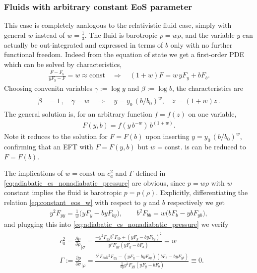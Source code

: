 \subsubsection{Fluids with arbitrary constant EoS parameter}

This case is completely analogous to the relativistic fluid case, simply with general $w$ instead of $w=\tfrac13$.
The fluid is barotropic $p=w\rho$, and the variable $y$ can actually be out-integrated and expressed in terms of $b$ only with no further functional freedom.
Indeed from the equation of state we get a first-order PDE which can be solved by characteristics,
\begin{align}\label{eq:constant_eos_w}
    \frac{F-F_b}{yF_y-F}=w\approx \mathrm{const}\quad\Rightarrow\quad (1+w)F=w\, yF_y+bF_b.
\end{align}
Choosing convenitn variables $\gamma:=\log y$ and $\beta:=\log b$, the characteristics are
{\small
\begin{align}\begin{aligned}
    \dot{\beta}&=1\,,\quad
    \dot{\gamma}=w \quad \Rightarrow\quad y = y_0\, (b/b_0)^w, \quad
    \dot{z}=(1+w)z\,.
\end{aligned}\end{align}}
The general solution is, for an arbitrary function $f=f(z)$ on one variable,
\begin{align}\label{eq:constant_eos_w_solution_pde}
    F(y,b)=f(y\,b^{-w})\, b^{(1+w)}.
\end{align}
Note it reduces to the solution for $F=F(b)$ upon inserting $y = y_0\, (b/b_0)^w$, confirming that 
an EFT with $F=F(y,b)$ but $w=\text{const}.$ is can be reduced to $F=F(b)$.

The implications of $w=\mathrm{const}$ on $c_a^2$ and $\Gamma$ defined in \eqref{eq:adiabatic_cs_nonadiabatic_pressure} are obvious, since $p=w\rho$ with $w$ constant implies the fluid is barotropic $p=p(\rho)$.
Explicitly, differentiating the relation \eqref{eq:constant_eos_w} with respect to $y$ and $b$ respectively we get
\begin{align}
    y^2F_{yy}=\tfrac{1}{w}\big(yF_y-byF_{by}\big), \qquad b^2 F_{bb}=w\big(bF_b-ybF_{yb}\big),
\end{align}
and plugging this into \eqref{eq:adiabatic_cs_nonadiabatic_pressure} we verify
{\small\begin{align}
\begin{aligned}
    &c_a^2=\frac{\partial p}{\partial \rho}_{|\sigma}=\frac{-y^2F_{yy}b^2F_{bb}+(yF_y-byF_{by})^2}{y^2F_{yy}(yF_y-bF_b)} \equiv w \\[3pt]
    &\Gamma:=\frac{\partial p}{\partial \sigma}_{\mid\rho}= \frac{b^2F_{bb}y^2F_{yy}-(yF_y-byF_{by})(bF_b-byF_{yb})}{\tfrac{1}{by}y^2F_{yy}(yF_y-bF_b)}\equiv 0.
\end{aligned}
\end{align}}



